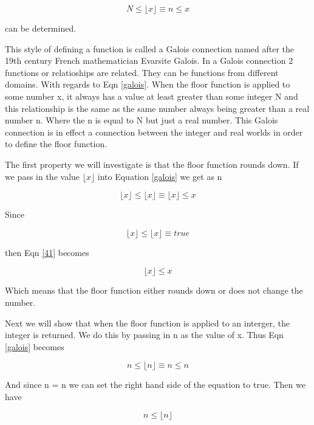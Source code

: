 \documentclass[10pt,a4paper]{article}
\providecommand{\floor}[1]{\lfloor #1 \rfloor  }
\begin{document}
\begin{equation}
N \le \floor{x} \equiv n \le x
\label{galois}
\end{equation}

can be determined.

This style of defining a function is called a Galois connection named after the 19th century French mathematician Evarsite Galois. In a Galois connection 2 functions or relatioships are related. They can be functions from different domains. With regards to Eqn \ref{galois}. When the floor function is applied to some number x, it always has a value at least greater than some integer N and this relationship is the same as the same number always being greater than a real number n. Where the n is equal to N but just a real number. This Galois connection is in effect a connection between the integer and real worlds in order to define the floor function.

The first property we will investigate is that the floor function rounds down. If we pass in the value $\floor{x}$ into Equation \ref{galois} we get as n

\begin{equation}
\floor{x} \le \floor{x} \equiv \floor{x} \le x
\label{41}
\end{equation}

Since 

\begin{equation}
\floor{x} \le \floor{x} \equiv true
\end{equation}

then Eqn \ref{41} becomes

\begin{equation}
\floor{x} \le x
\label{42}
\end{equation}

Which means that the floor function either rounds down or does not change the number.

Next we will show that when the floor function is applied to an interger, the integer is returned. We do this by passing in n as the value of x. Thus Eqn \ref{galois} becomes

\begin{equation}
n \le \floor{n} \equiv n \le n
\end{equation}

And since n = n we can set the right hand side of the equation to true. Then we have  

\begin{equation}
n \le \floor{n}
\end{equation}
\end{document}
